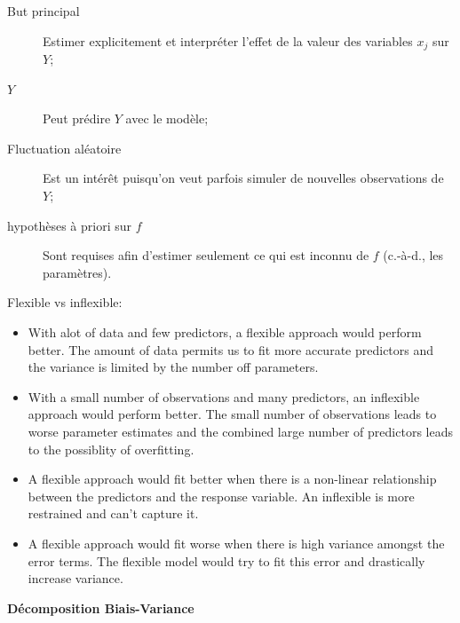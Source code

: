 \documentclass[10pt, french]{article}
\begin{document}
\begin{multicols*}{3}
\begin{definitionNOHFILLsub}
\begin{description}
	\item[But principal]	Estimer explicitement et interpréter l'effet de la valeur des variables $x_{j}$ sur $Y$;
	\item[$Y$]	Peut prédire $Y$ avec le modèle;
	\item[Fluctuation aléatoire]	Est un intérêt puisqu'on veut parfois simuler de nouvelles observations de $Y$;
	\item[hypothèses à priori sur $f$]	Sont requises afin d'estimer seulement ce qui est inconnu de $f$ (c.-à-d., les paramètres).
\end{description}
\end{definitionNOHFILLsub}

Flexible vs inflexible:
\begin{itemize}
	\item	With alot of data and few predictors, a flexible approach would perform better. The amount of data permits us to fit more accurate predictors and the variance is limited by the number off parameters. 
	\item	With a small number of observations and many predictors, an inflexible approach would perform better. The small number of observations leads to worse parameter estimates and the combined large number of predictors leads to the possiblity of overfitting.
	\item	A flexible approach would fit better when there is a non-linear relationship between the predictors and the response variable. An inflexible is more restrained and can't capture it.
	\item	A flexible approach would fit worse when there is high variance amongst the error terms. The flexible model would try to fit this error and drastically increase variance.
\end{itemize}


\begin{center}
	\textbf{Décomposition Biais-Variance}\\

\begin{tikzpicture}[x=0.75pt,y=0.75pt,yscale=-1,xscale=1]


\end{tikzpicture}
\end{center}
\end{multicols*}
\end{document}
